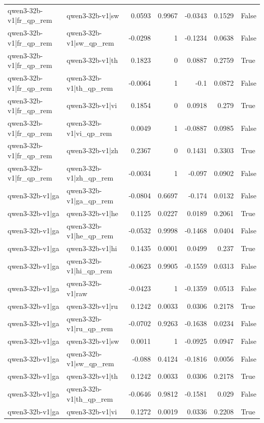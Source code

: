 \begin{table}
\begin{tabular}{l l r r r r l}
qwen3-32b-v1|fr_qp_rem & qwen3-32b-v1|sw & 0.0593 & 0.9967 & -0.0343 & 0.1529 & False \\
qwen3-32b-v1|fr_qp_rem & qwen3-32b-v1|sw_qp_rem & -0.0298 & 1 & -0.1234 & 0.0638 & False \\
qwen3-32b-v1|fr_qp_rem & qwen3-32b-v1|th & 0.1823 & 0 & 0.0887 & 0.2759 & True \\
qwen3-32b-v1|fr_qp_rem & qwen3-32b-v1|th_qp_rem & -0.0064 & 1 & -0.1 & 0.0872 & False \\
qwen3-32b-v1|fr_qp_rem & qwen3-32b-v1|vi & 0.1854 & 0 & 0.0918 & 0.279 & True \\
qwen3-32b-v1|fr_qp_rem & qwen3-32b-v1|vi_qp_rem & 0.0049 & 1 & -0.0887 & 0.0985 & False \\
qwen3-32b-v1|fr_qp_rem & qwen3-32b-v1|zh & 0.2367 & 0 & 0.1431 & 0.3303 & True \\
qwen3-32b-v1|fr_qp_rem & qwen3-32b-v1|zh_qp_rem & -0.0034 & 1 & -0.097 & 0.0902 & False \\
qwen3-32b-v1|ga & qwen3-32b-v1|ga_qp_rem & -0.0804 & 0.6697 & -0.174 & 0.0132 & False \\
qwen3-32b-v1|ga & qwen3-32b-v1|he & 0.1125 & 0.0227 & 0.0189 & 0.2061 & True \\
qwen3-32b-v1|ga & qwen3-32b-v1|he_qp_rem & -0.0532 & 0.9998 & -0.1468 & 0.0404 & False \\
qwen3-32b-v1|ga & qwen3-32b-v1|hi & 0.1435 & 0.0001 & 0.0499 & 0.237 & True \\
qwen3-32b-v1|ga & qwen3-32b-v1|hi_qp_rem & -0.0623 & 0.9905 & -0.1559 & 0.0313 & False \\
qwen3-32b-v1|ga & qwen3-32b-v1|raw & -0.0423 & 1 & -0.1359 & 0.0513 & False \\
qwen3-32b-v1|ga & qwen3-32b-v1|ru & 0.1242 & 0.0033 & 0.0306 & 0.2178 & True \\
qwen3-32b-v1|ga & qwen3-32b-v1|ru_qp_rem & -0.0702 & 0.9263 & -0.1638 & 0.0234 & False \\
qwen3-32b-v1|ga & qwen3-32b-v1|sw & 0.0011 & 1 & -0.0925 & 0.0947 & False \\
qwen3-32b-v1|ga & qwen3-32b-v1|sw_qp_rem & -0.088 & 0.4124 & -0.1816 & 0.0056 & False \\
qwen3-32b-v1|ga & qwen3-32b-v1|th & 0.1242 & 0.0033 & 0.0306 & 0.2178 & True \\
qwen3-32b-v1|ga & qwen3-32b-v1|th_qp_rem & -0.0646 & 0.9812 & -0.1581 & 0.029 & False \\
qwen3-32b-v1|ga & qwen3-32b-v1|vi & 0.1272 & 0.0019 & 0.0336 & 0.2208 & True \\

\end{tabular}
\end{table}
